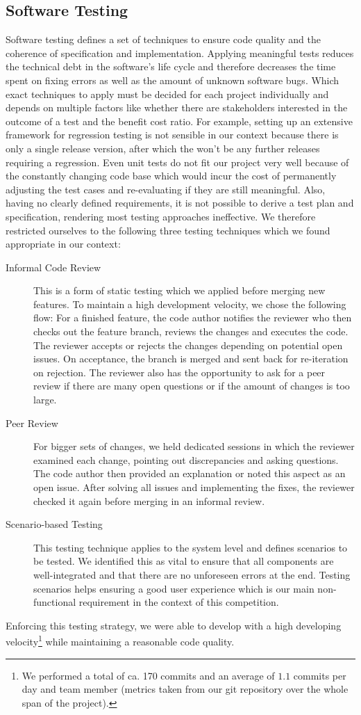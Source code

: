 \subsection{Software Testing}\label{subsec:sw_testing}
Software testing defines a set of techniques to ensure code quality and the coherence of specification and implementation.
Applying meaningful tests reduces the technical debt in the software's life cycle and therefore decreases the time spent on fixing errors as well as the amount of unknown software bugs.
Which exact techniques to apply must be decided for each project individually and depends on multiple factors like whether there are stakeholders interested in the outcome of a test and the benefit cost ratio.
For example, setting up an extensive framework for regression testing is not sensible in our context because there is only a single release version, after which the won't be any further releases requiring a regression.
Even unit tests do not fit our project very well because of the constantly changing code base which would incur the cost of permanently adjusting the test cases and re-evaluating if they are still meaningful.
Also, having no clearly defined requirements, it is not possible to derive a test plan and specification, rendering most testing approaches ineffective.
We therefore restricted ourselves to the following three testing techniques which we found appropriate in our context:
\begin{description}
	\item[Informal Code Review] This is a form of static testing which we applied before merging new features. To maintain a high development velocity, we chose the following flow: For a finished feature, the code author notifies the reviewer who then checks out the feature branch, reviews the changes and executes the code. The reviewer accepts or rejects the changes depending on potential open issues. On acceptance, the branch is merged and sent back for re-iteration on rejection. The reviewer also has the opportunity to ask for a peer review if there are many open questions or if the amount of changes is too large.
	\item[Peer Review] For bigger sets of changes, we held dedicated sessions in which the reviewer examined each change, pointing out discrepancies and asking questions. The code author then provided an explanation or noted this aspect as an open issue. After solving all issues and implementing the fixes, the reviewer checked it again before merging in an informal review.
	\item[Scenario-based Testing] This testing technique applies to the system level and defines scenarios to be tested. We identified this as vital to ensure that all components are well-integrated and that there are no unforeseen errors at the end. Testing scenarios helps ensuring a good user experience which is our main non-functional requirement in the context of this competition. 
\end{description}
Enforcing this testing strategy, we were able to develop with a high developing velocity\footnote{We performed a total of ca. 170 commits and an average of $1.1$ commits per day and team member (metrics taken from our git repository over the whole span of the project).} while maintaining a reasonable code quality.

